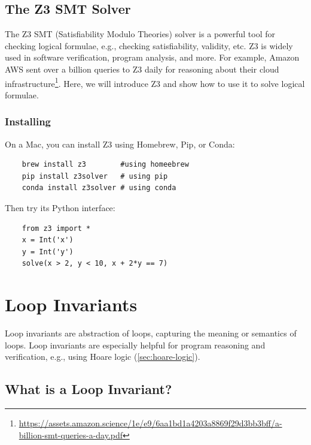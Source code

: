 \documentclass[oneside,11pt,dvipsnames]{book}
\begin{document}

\section{The Z3 SMT Solver}\label{sec:z3-smt-solver}

The Z3 SMT (Satisfiability Modulo Theories) solver is a powerful tool for checking logical formulae, e.g., checking satisfiability, validity, etc. Z3 is widely used in software verification, program analysis, and more.  For example, Amazon AWS sent over a billion queries to Z3 daily for reasoning about their cloud infrastructure\footnote{\url{https://assets.amazon.science/1e/e9/6aa1bd1a4203a8869f29d3bb3bff/a-billion-smt-queries-a-day.pdf}}.  Here, we will introduce Z3 and show how to use it to solve logical formulae.

\subsection{Installing}

On a Mac, you can install Z3 using Homebrew, Pip, or Conda: 

\begin{lstlisting}
    brew install z3        #using homeebrew
    pip install z3solver   # using pip
    conda install z3solver # using conda
\end{lstlisting}    

Then try its Python interface:

\begin{lstlisting}
    from z3 import *
    x = Int('x')
    y = Int('y')
    solve(x > 2, y < 10, x + 2*y == 7)
\end{lstlisting} 




\chapter{Loop Invariants}\label{chap:loop-invariants}

Loop invariants are abstraction of loops, capturing the meaning or semantics of loops. Loop invariants are especially helpful for program reasoning and verification, e.g., using Hoare logic (\autoref{sec:hoare-logic}).


\section{What is a Loop Invariant?}\label{what-is-a-loop-invariant}
\end{document}

